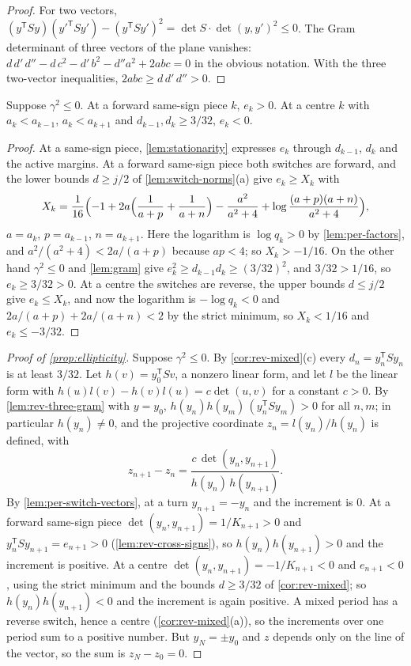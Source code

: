 \begin{proof}
For two vectors, $(y^{\mathsf T}Sy)(y'^{\mathsf T}Sy')-(y^{\mathsf T}Sy')^2=\det S\cdot\det(y,y')^2\le0$.
The Gram determinant of three vectors of the plane vanishes:
$d\,d'\,d''-d\,c^2-d'\,b^2-d''a^2+2abc=0$ in the obvious notation. With the three two-vector
inequalities, $2abc\ge d\,d'\,d''>0$.
\end{proof}

\begin{lemma}\label{lem:rev-cross-signs}
Suppose $\gamma^2\le0$. At a forward same-sign piece $k$, $e_k>0$. At a centre $k$ with
$a_k<a_{k-1}$, $a_k<a_{k+1}$ and $d_{k-1},d_k\ge3/32$, $e_k<0$.
\end{lemma}

\begin{proof}
At a same-sign piece, \cref{lem:stationarity} expresses $e_k$ through $d_{k-1}$, $d_k$ and the
active margins. At a forward same-sign piece both switches are forward, and the lower bounds
$d\ge j/2$ of \cref{lem:switch-norms}(a) give $e_k\ge X_k$ with
\[
  X_k=\frac1{16}\Bigl(-1+2a\Bigl(\frac1{a+p}+\frac1{a+n}\Bigr)-\frac{a^2}{a^2+4}
  +\log\frac{(a+p)(a+n)}{a^2+4}\Bigr),
\]
$a=a_k$, $p=a_{k-1}$, $n=a_{k+1}$. Here the logarithm is $\log q_k>0$ by
\cref{lem:per-factors}, and $a^2/(a^2+4)<2a/(a+p)$ because $ap<4$; so $X_k>-1/16$. On the other
hand $\gamma^2\le0$ and \cref{lem:gram} give $e_k^2\ge d_{k-1}d_k\ge(3/32)^2$, and $3/32>1/16$, so
$e_k\ge3/32>0$. At a centre the switches are reverse, the upper bounds $d\le j/2$ give
$e_k\le X_k$, and now the logarithm is $-\log q_k<0$ and $2a/(a+p)+2a/(a+n)<2$ by the strict
minimum, so $X_k<1/16$ and $e_k\le-3/32$.
\end{proof}

\begin{proof}[Proof of \cref{prop:ellipticity}]
Suppose $\gamma^2\le0$. By \cref{cor:rev-mixed}(c) every $d_n=y_n^{\mathsf T}Sy_n$ is at least
$3/32$. Let $h(v)=y_0^{\mathsf T}Sv$, a nonzero linear form, and let $l$ be the linear form with
$h(u)l(v)-h(v)l(u)=c\det(u,v)$ for a constant $c>0$. By \cref{lem:rev-three-gram} with
$y=y_0$, $h(y_n)h(y_m)\,(y_n^{\mathsf T}Sy_m)>0$ for all $n,m$; in particular $h(y_n)\ne0$, and the
projective coordinate $z_n=l(y_n)/h(y_n)$ is defined, with
\[
  z_{n+1}-z_n=\frac{c\,\det(y_n,y_{n+1})}{h(y_n)\,h(y_{n+1})}.
\]
By \cref{lem:per-switch-vectors}, at a turn $y_{n+1}=-y_n$ and the increment is $0$. At a forward
same-sign piece $\det(y_n,y_{n+1})=1/K_{n+1}>0$ and $y_n^{\mathsf T}Sy_{n+1}=e_{n+1}>0$
(\cref{lem:rev-cross-signs}), so $h(y_n)h(y_{n+1})>0$ and the increment is positive. At a centre
$\det(y_n,y_{n+1})=-1/K_{n+1}<0$ and $e_{n+1}<0$, using the strict minimum and the bounds
$d\ge3/32$ of \cref{cor:rev-mixed}; so $h(y_n)h(y_{n+1})<0$ and the increment is again positive.
A mixed period has a reverse switch, hence a centre (\cref{cor:rev-mixed}(a)), so the increments
over one period sum to a positive number. But $y_N=\pm y_0$ and $z$ depends only on the line of
the vector, so the sum is $z_N-z_0=0$.
\end{proof}

